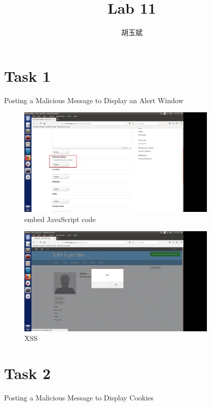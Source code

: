 \documentclass[onecolumn,oneside]{SUSTechHomework}
\author{胡玉斌}
\title{Lab 11}
\begin{document}
  \maketitle

  \section*{Task 1}
  Posting a Malicious Message to Display an Alert Window

  \begin{figure}[H]
    \centering
    \includegraphics[width=0.85\textwidth]{img/task1_1.png}
    \caption{embed JavaScript code}
  \end{figure}

  \begin{figure}[H]
    \centering
    \includegraphics[width=0.85\textwidth]{img/task1_2.png}
    \caption{XSS}
  \end{figure}

  \section*{Task 2}
  Posting a Malicious Message to Display Cookies
\end{document}
